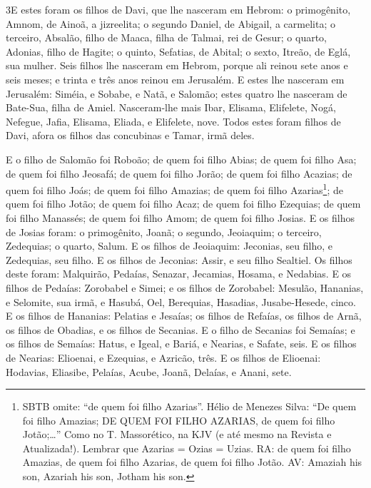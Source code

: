 \medskip

\lettrine{3} E estes foram os filhos de Davi, que lhe nasceram
em Hebrom: o primogênito, Amnom, de Ainoã, a jizreelita; o segundo
Daniel, de Abigail, a carmelita; o terceiro, Absalão, filho de
Maaca, filha de Talmai, rei de Gesur; o quarto, Adonias, filho de
Hagite; o quinto, Sefatias, de Abital; o sexto, Itreão, de Eglá,
sua mulher. Seis filhos lhe nasceram em Hebrom, porque ali
reinou sete anos e seis meses; e trinta e três anos reinou em
Jerusalém. E estes lhe nasceram em Jerusalém: Siméia, e Sobabe,
e Natã, e Salomão; estes quatro lhe nasceram de Bate-Sua, filha de
Amiel. Nasceram-lhe mais Ibar, Elisama, Elifelete, Nogá,
Nefegue, Jafia, Elisama, Eliada, e Elifelete, nove. Todos
estes foram filhos de Davi, afora os filhos das concubinas e Tamar,
irmã deles.

E o filho de Salomão foi Roboão; de quem foi filho Abias; de quem
foi filho Asa; de quem foi filho Jeosafá; de quem foi filho
Jorão; de quem foi filho Acazias; de quem foi filho Joás; de
quem foi filho Amazias; de quem foi filho Azarias\footnote{SBTB
omite: ``de quem foi filho Azarias''. Hélio de Menezes Silva: ``De
quem foi filho Amazias; DE QUEM FOI FILHO AZARIAS, de quem foi filho
Jotão;\ldots'' Como no T. Massorético, na KJV (e até mesmo na
Revista e Atualizada!). Lembrar que Azarias = Ozias = Uzias. RA: de
quem foi filho Amazias, de quem foi filho Azarias, de quem foi filho
Jotão. AV:  Amaziah his son, Azariah his son, Jotham his son.}; de
quem foi filho Jotão; de quem foi filho Acaz; de quem foi
filho Ezequias; de quem foi filho Manassés; de quem foi filho
Amom; de quem foi filho Josias. E os filhos de Josias foram:
o primogênito, Joanã; o segundo, Jeoiaquim; o terceiro, Zedequias; o
quarto, Salum. E os filhos de Jeoiaquim: Jeconias, seu filho,
e Zedequias, seu filho. E os filhos de Jeconias: Assir, e seu
filho Sealtiel. Os filhos deste foram: Malquirão, Pedaías,
Senazar, Jecamias, Hosama, e Nedabias. E os filhos de
Pedaías: Zorobabel e Simei; e os filhos de Zorobabel: Mesulão,
Hananias, e Selomite, sua irmã, e Hasubá, Oel, Berequias,
Hasadias, Jusabe-Hesede, cinco. E os filhos de Hananias:
Pelatias e Jesaías; os filhos de Refaías, os filhos de Arnã, os
filhos de Obadias, e os filhos de Secanias. E o filho de
Secanias foi Semaías; e os filhos de Semaías: Hatus, e Igeal, e
Bariá, e Nearias, e Safate, seis. E os filhos de Nearias:
Elioenai, e Ezequias, e Azricão, três. E os filhos de
Elioenai: Hodavias, Eliasibe, Pelaías, Acube, Joanã, Delaías, e
Anani, sete.

\medskip


